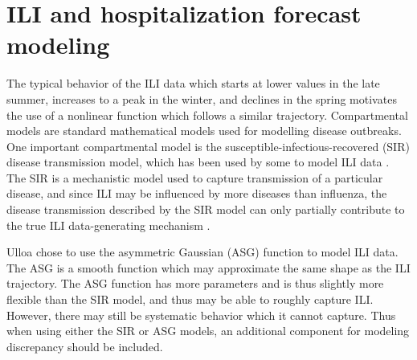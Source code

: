 




























\section{ILI and hospitalization forecast modeling} \label{sec:functions}


The typical behavior of the ILI data which starts at lower values in the late 
summer, increases to a peak in the winter, 
and declines in the spring motivates the use of a nonlinear function which follows 
a similar trajectory. Compartmental models are standard mathematical models 
used for modelling disease outbreaks. One important compartmental model is the 
susceptible-infectious-recovered (SIR) 
disease transmission model, which has been used by some to model 
ILI data \cite[]{osthus2019dynamic, allen2017primer}.  
The SIR is a mechanistic model used to capture transmission of a particular
disease, and since ILI may be influenced by more 
diseases than influenza, the disease transmission described by the SIR model
can only partially contribute to the true ILI data-generating mechanism
\cite[]{osthus2019dynamic}.

Ulloa \cite[]{ulloa2019} 
chose to use the asymmetric Gaussian (ASG) function to model ILI data.
The ASG is a smooth function which may approximate the 
same shape as the ILI trajectory.
The ASG function has more parameters and is thus slightly more flexible than
the SIR model, and thus may be able to roughly capture ILI.
However, there may still be 
systematic behavior which it cannot capture. Thus when using either the SIR
or ASG models, an additional component for modeling discrepancy should be 
included.

